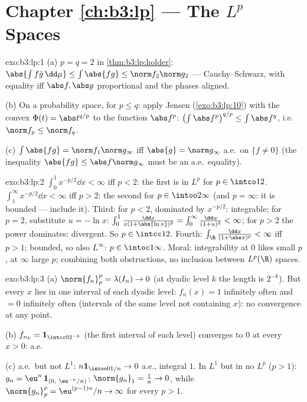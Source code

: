 \section*{Chapter \ref{ch:b3:lp} --- The $L^p$ Spaces}

\begin{solution}{exo:b3:lp:1}
(a) $p = q = 2$ in \cref{thm:b3:lp:holder}: $\abs{\int f\bar
g\,\dd\mu} \leq \int\abs{fg} \leq \norm f_2\norm g_2$ ---
Cauchy--Schwarz, with equality iff $\abs f, \abs g$
proportional and the phases aligned.

(b) On a probability space, for $p \leq q$: apply Jensen
(\cref{exo:b3:lp:10}) with the convex $\Phi(t) =
\abs t^{q/p}$ to the function $\abs f^p$:
$\bigl(\int\abs f^p\bigr)^{q/p} \leq \int\abs f^q$, i.e.\
$\norm f_p \leq \norm f_q$.

(c) $\int\abs{fg} = \norm f_1\norm g_\infty$ iff $\abs{g} =
\norm g_\infty$ a.e.\ on $\{f \neq 0\}$ (the inequality
$\abs{fg} \leq \abs f\norm g_\infty$ must be an a.e.\
equality).
\end{solution}

\begin{solution}{exo:b3:lp:2}
$\int_0^1 x^{-p/2}\dd x < \infty$ iff $p < 2$: the first is in
$L^p$ for $p \in \intco12$. $\int_1^\infty x^{-p/2}\dd x <
\infty$ iff $p > 2$: the second for $p \in \intoo2\infty$ (and
$p = \infty$: it is bounded --- include it). Third: for $p <
2$, dominated by $x^{-p/2}$: integrable; for $p = 2$,
substitute $u = -\ln x$: $\int_0^1\frac{\dd x}{x(1 + \abs{\ln
x})^2} = \int_0^\infty\frac{\dd u}{(1 + u)^2} < \infty$; for
$p > 2$ the power dominates: divergent. So $p \in \intcc12$.
Fourth: $\int_\R\frac{\dd x}{(1 + \abs x)^p} < \infty$ iff $p >
1$; bounded, so also $L^\infty$: $p \in
\intoc1\infty$. Moral: integrability at $0$ likes small $p$, at
$\infty$ large $p$; combining both obstructions, no inclusion
between $L^p(\R)$ spaces.
\end{solution}

\begin{solution}{exo:b3:lp:3}
(a) $\norm{f_n}_p^p = \lambda(I_n) \to 0$ (at dyadic level $k$
the length is $2^{-k}$). But every $x$ lies in one interval of
each dyadic level: $f_n(x) = 1$ infinitely often and $= 0$
infinitely often (intervals of the same level not containing
$x$): no convergence at any point.

(b) $f_{n_k} = \mathbf 1_{\intcc0{2^{-k}}}$ (the first interval
of each level) converges to $0$ at every $x > 0$: a.e.

(c) a.e.\ but not $L^1$: $n\mathbf 1_{\intoo0{1/n}} \to 0$
a.e., integral $1$. In $L^1$ but in no $L^p$ ($p > 1$): $g_n =
\eu^n\,\mathbf 1_{(0,\ \eu^{-n}/n)}$: $\norm{g_n}_1 = \frac1n
\to 0$, while $\norm{g_n}_p^p = \eu^{(p-1)n}/n \to \infty$ for
every $p > 1$.
\end{solution}

